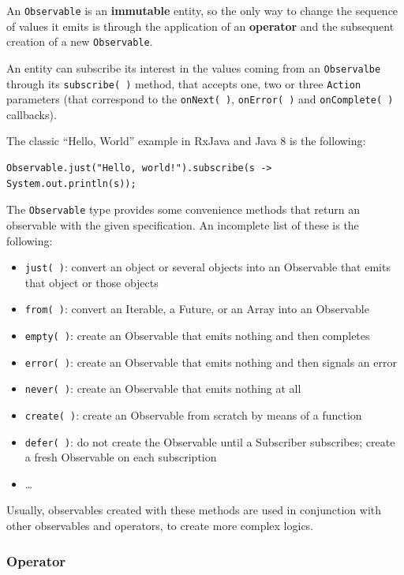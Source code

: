 An \texttt{Observable} is an \textbf{immutable} entity, so the only way
to change the sequence of values it emits is through the application of
an \textbf{operator} and the subsequent creation of a new
\texttt{Observable}.

An entity can subscribe its interest in the values coming from an
\texttt{Observalbe} through its \texttt{subscribe(\ )} method, that
accepts one, two or three \texttt{Action} parameters (that correspond to
the \texttt{onNext(\ )}, \texttt{onError(\ )} and
\texttt{onComplete(\ )} callbacks).

The classic ``Hello, World'' example in RxJava and Java 8 is the
following:

\begin{verbatim}
Observable.just("Hello, world!").subscribe(s -> System.out.println(s));
\end{verbatim}

The \texttt{Observable} type provides some convenience methods that
return an observable with the given specification. An incomplete list
of these is the following:

\begin{itemize}
\itemsep1pt\parskip0pt
\item
  \texttt{just(\ )}: convert an object or several objects into an
  Observable that emits that object or those objects
\item
  \texttt{from(\ )}: convert an Iterable, a Future, or an Array into an
  Observable
\item
  \texttt{empty(\ )}: create an Observable that emits nothing and then
  completes
\item
  \texttt{error(\ )}: create an Observable that emits nothing and then
  signals an error
\item
  \texttt{never(\ )}: create an Observable that emits nothing at all
\item
  \texttt{create(\ )}: create an Observable from scratch by means of a
  function
\item
  \texttt{defer(\ )}: do not create the Observable until a Subscriber
  subscribes; create a fresh Observable on each subscription
\item
  \ldots{}
\end{itemize}

Usually, observables created with these methods are used in conjunction
with other observables and operators, to create more complex logics.

\subsubsection{Operator}\label{operator}

